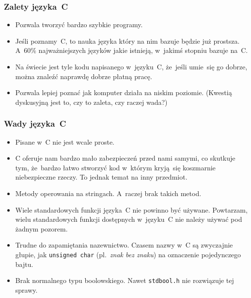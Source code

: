 \documentclass[10pt,t]{beamer}
\begin{document}
\begin{frame}
  \frametitle{Zalety języka~C}


  \begin{itemize}

  \item Pozwala tworzyć bardzo szybkie programy.

  \item Jeśli poznamy~C, to nauka języka który na nim bazuje będzie
    już prostsza. A~60\% najważniejszych języków jakie istnieją, w~jakimś
    stopniu bazuje na~C.

  \item Na świecie jest tyle kodu napisanego w~języku~C, że~jeśli umie~się
    go dobrze, można znaleźć naprawdę dobrze płatną pracę.

  \item Pozwala lepiej poznać jak komputer działa na niskim poziomie.
    (Kwestią dyskusyjną jest to, czy to zaleta, czy raczej wada?)

  \end{itemize}

\end{frame}





\begin{frame}
  \frametitle{Wady języka~C}


  \begin{itemize}

  \item Pisane w~C nie jest wcale proste.

  \item C oferuje nam bardzo mało zabezpieczeń przed nami samymi, co
    skutkuje tym, że~bardzo łatwo stworzyć kod w~którym kryją~się
    koszmarnie niebezpieczne rzeczy. To jednak temat na inny przedmiot.

  \item Metody operowania na stringach. A~raczej brak takich metod.

  \item Wiele standardowych funkcji języka~C \alert{nie} powinno być
    używane. Powtarzam, wielu standardowych funkcji dostępnych w~języku~C
    \alert{nie należy} używać pod żadnym pozorem.

  \item Trudne do zapamiętania nazewnictwo. Czasem nazwy w~C są zwyczajnie
    głupie, jak \texttt{unsigned char} (pl.~\textit{znak bez znaku}) na
    oznaczenie pojedynczego bajtu.

  \item Brak normalnego typu boolowskiego. Nawet \texttt{stdbool.h} nie
    rozwiązuje tej sprawy.


  \end{itemize}

\end{frame}
\end{document}

